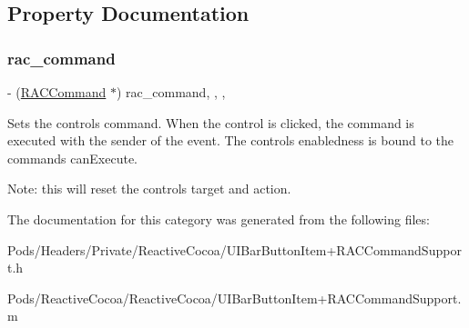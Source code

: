\subsection{Property Documentation}
\mbox{\label{category_u_i_bar_button_item_07_r_a_c_command_support_08_a1ba2d0ff758e120019e8bdebd9241a66}} 
\subsubsection{\texorpdfstring{rac\+\_\+command}{rac\_command}}
{\footnotesize\ttfamily -\/ (\mbox{\hyperlink{interface_r_a_c_command}{R\+A\+C\+Command}} $\ast$) rac\+\_\+command\hspace{0.3cm}{\ttfamily [read]}, {\ttfamily [write]}, {\ttfamily [nonatomic]}, {\ttfamily [strong]}}

Sets the control\textquotesingle{}s command. When the control is clicked, the command is executed with the sender of the event. The control\textquotesingle{}s enabledness is bound to the command\textquotesingle{}s {\ttfamily can\+Execute}.

Note\+: this will reset the control\textquotesingle{}s target and action. 

The documentation for this category was generated from the following files\+:\begin{DoxyCompactItemize}
\item 
Pods/\+Headers/\+Private/\+Reactive\+Cocoa/U\+I\+Bar\+Button\+Item+\+R\+A\+C\+Command\+Support.\+h\item 
Pods/\+Reactive\+Cocoa/\+Reactive\+Cocoa/U\+I\+Bar\+Button\+Item+\+R\+A\+C\+Command\+Support.\+m\end{DoxyCompactItemize}
